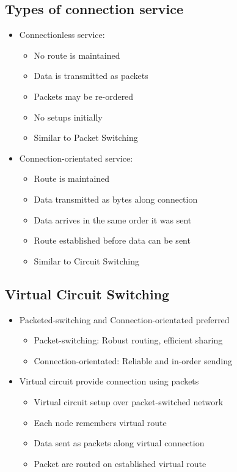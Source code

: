\documentclass[conference]{IEEEtran}
\begin{document}
\subsection{Types of connection service}

\begin{itemize}
    \item Connectionless service:
    \begin{itemize}
        \item No route is maintained
        \item Data is transmitted as packets 
        \item Packets may be re-ordered 
        \item No setups initially
        \item Similar to Packet Switching
    \end{itemize}
    \item Connection-orientated service:
    \begin{itemize}
        \item Route is maintained 
        \item Data transmitted as bytes along connection 
        \item Data arrives in the same order it was sent 
        \item Route established before data can be sent 
        \item Similar to Circuit Switching 
    \end{itemize}
\end{itemize}

\pagebreak
\subsection{Virtual Circuit Switching}

\begin{itemize}
    \item Packeted-switching and Connection-orientated preferred
    \begin{itemize}
        \item Packet-switching: Robust routing, efficient sharing
        \item Connection-orientated: Reliable and in-order sending 
    \end{itemize}
    \item Virtual circuit provide connection using packets 
    \begin{itemize}
        \item Virtual circuit setup over packet-switched network
        \item Each node remembers virtual route  
        \item Data sent as packets along virtual connection 
        \item Packet are routed on established virtual route
    \end{itemize}
\end{itemize}
\end{document}

